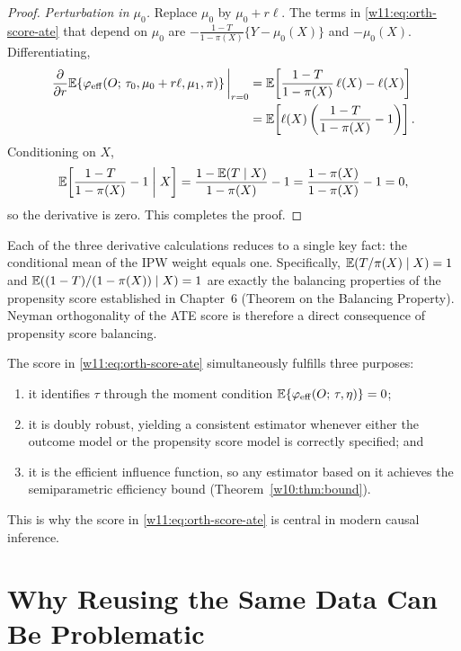 \documentclass[master.tex]{subfiles}
\begin{document}
\begin{proof}
\medskip
\noindent\textit{Perturbation in $\mu_0$.}\enspace
Replace $\mu_0$ by $\mu_0 + r\ell$.  The terms in
\eqref{w11:eq:orth-score-ate} that depend on $\mu_0$ are
$-\frac{1-T}{1-\pi(X)}\{Y-\mu_0(X)\}$ and $-\mu_0(X)$.
Differentiating,
\begin{align*}
  \frac{\partial}{\partial r}
  \mathbb{E}\!\left\{\varphi_{\mathrm{eff}}(O;\,\tau_0,\mu_0+r\ell,\mu_1,\pi)\right\}
  \bigg|_{r=0}
  &=
  \mathbb{E}\!\left[\frac{1-T}{1-\pi(X)}\,\ell(X) - \ell(X)\right] \\
  &=
  \mathbb{E}\!\left[\ell(X)\left(\frac{1-T}{1-\pi(X)} - 1\right)\right].
\end{align*}
Conditioning on $X$,
\[
  \mathbb{E}\!\left[\frac{1-T}{1-\pi(X)} - 1\;\middle|\; X\right]
  = \frac{1 - \mathbb{E}(T\mid X)}{1-\pi(X)} - 1
  = \frac{1-\pi(X)}{1-\pi(X)} - 1 = 0,
\]
so the derivative is zero.  This completes the proof.
\end{proof}

\begin{remark}
\label{w11:rem:orthog-insight}
Each of the three derivative calculations reduces to a single key
fact: the conditional mean of the IPW weight equals one.
Specifically, $\mathbb{E}(T/\pi(X)\mid X) = 1$ and
$\mathbb{E}((1-T)/(1-\pi(X))\mid X) = 1$ are exactly the balancing
properties of the propensity score established in
Chapter~6 (Theorem on the Balancing Property).  Neyman
orthogonality of the ATE score is therefore a direct consequence
of propensity score balancing.
\end{remark}

The score in \eqref{w11:eq:orth-score-ate} simultaneously fulfills
three purposes:
\begin{enumerate}
  \item it identifies $\tau$ through the moment condition
    $\mathbb{E}\{\varphi_{\mathrm{eff}}(O;\,\tau,\eta)\} = 0$;
  \item it is doubly robust, yielding a consistent estimator
    whenever either the outcome model or the propensity score model
    is correctly specified; and
  \item it is the efficient influence function, so any estimator
    based on it achieves the semiparametric efficiency bound
    (Theorem~\ref{w10:thm:bound}).
\end{enumerate}
This is why the score in \eqref{w11:eq:orth-score-ate} is central
in modern causal inference.


\section{Why Reusing the Same Data Can Be Problematic}
\label{w11:sec:reuse}
\end{document}
